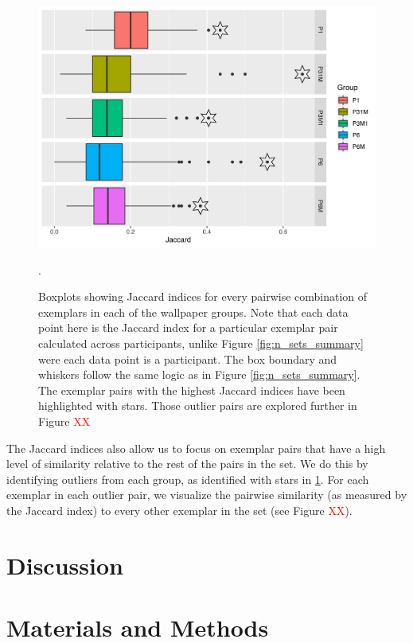 \documentclass[11pt, twoside]{article}
\begin{document}
\begin{figure}[t]
	\centering
	\includegraphics[width=\linewidth]{./figures/jaccard_summary.pdf}
	\caption{Boxplots showing Jaccard indices for every pairwise combination of exemplars in each of the wallpaper groups. Note that each data point here is the Jaccard index for a particular exemplar pair calculated across participants, unlike Figure \ref{fig:n_sets_summary} were each data point is a participant. The box boundary and whiskers follow the same logic as in Figure \ref{fig:n_sets_summary}. The exemplar pairs with the highest Jaccard indices have been highlighted with stars. Those outlier pairs are explored further in Figure \textcolor{red}{XX}}.
	\label{fig:jaccard_summary}
\end{figure}

The Jaccard indices also allow us to focus on exemplar pairs that have a high level of similarity relative to the rest of the pairs in the set. We do this by identifying outliers from each group, as identified with stars in \ref{fig:jaccard_summary}. For each exemplar in each outlier pair, we visualize the pairwise similarity (as measured by the Jaccard index) to every other exemplar in the set (see Figure \textcolor{red}{XX}). 

\section*{Discussion}

\section*{Materials and Methods}
\label{methods}
\end{document}
